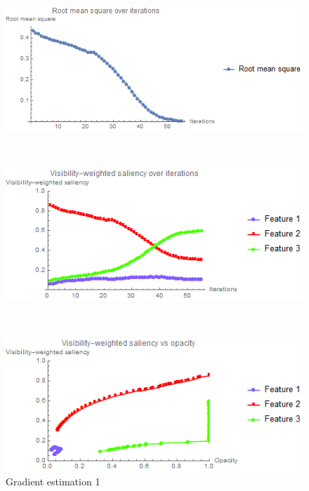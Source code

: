 \begin{figure}
	\centering
	\begin{minipage}{.33\textwidth}
		\includegraphics[width=1\linewidth]{images/nucleon_strong_red_rms_difference}
	\end{minipage}~
	\begin{minipage}{.33\textwidth}
		\includegraphics[width=1\linewidth]{images/nucleon_strong_red_saliency_difference}	
	\end{minipage}~
	\begin{minipage}{.33\textwidth}
		\includegraphics[width=1\linewidth]{images/nucleon_strong_red_saliencyopacity_difference}
	\end{minipage}
	\caption{Gradient estimation 1}
	\label{fig:nucleon_strong_red_plot_difference}
\end{figure}

